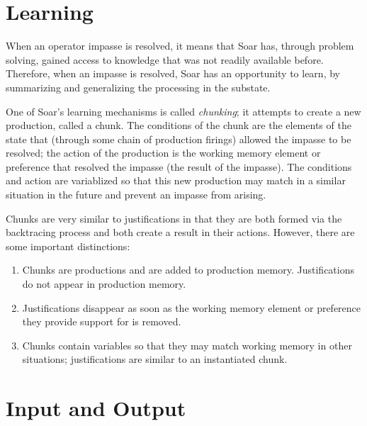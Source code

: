 \section{Learning}
\label{ARCH-learning} 

When an operator impasse is resolved, it means that Soar has, through problem 
solving,
gained access to knowledge that was not readily available before. Therefore,
when an impasse is resolved, Soar has an opportunity to learn, by summarizing
and generalizing the processing in the substate.

One of Soar's learning mechanisms is called \textit{chunking}; it attempts to create a
new production, called a chunk. The conditions of the chunk are the elements
of the state that (through some chain of production firings) allowed the
impasse to be resolved; the action of the production is the working
memory element or preference that
resolved the impasse (the result of the impasse). The conditions and action
are variablized so that this new production may match in a similar situation
in the future and prevent an impasse from arising. 

Chunks are very similar to justifications in that they are both
formed via the backtracing process and both create a result in their
actions. However, there are some important distinctions:\vspace{-12pt}
\begin{enumerate}
\item Chunks are productions and are added to production memory.
	Justifications do not appear in production memory.\vspace{-8pt}
\item Justifications disappear as soon as the working memory element or
         preference they provide support
	for is removed. \vspace{-8pt}
\item Chunks contain variables so that they may match working memory in other
	situations; justifications are similar to an instantiated chunk.
\end{enumerate}




\section{Input and Output}
\label{ARCH-io}	%

